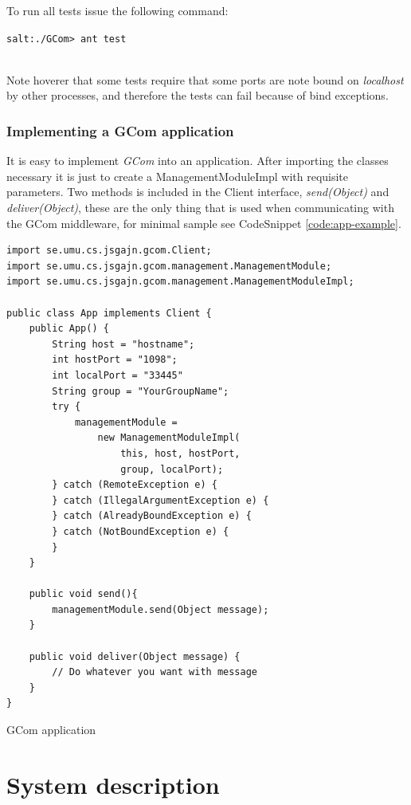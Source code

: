 \documentclass[titlepage, twocolumn, a4paper, 10pt]{article}
\begin{document}
To run all tests issue the following command:\\
\begin{footnotesize}
  \verb!salt:./GCom> ant test!
\end{footnotesize}\\
Note hoverer that some tests require that some ports are note bound on
\textit{localhost} by other processes, and therefore the tests can
fail because of bind exceptions.

\subsubsection{Implementing a GCom application}\label{sec:implgcom}
It is easy to implement \textit{GCom} into an application. After
importing the classes necessary it is just to create a
ManagementModuleImpl with requisite parameters. Two methods is
included in the Client interface, \textit{send(Object)} and
\textit{deliver(Object)}, these are the only thing that is used when
communicating with the GCom middleware, for minimal sample see
CodeSnippet \ref{code:app-example}.
\begin{code}
  \begin{footnotesize}
\begin{verbatim}
import se.umu.cs.jsgajn.gcom.Client;
import se.umu.cs.jsgajn.gcom.management.ManagementModule;
import se.umu.cs.jsgajn.gcom.management.ManagementModuleImpl;

public class App implements Client {
    public App() {
        String host = "hostname";
        int hostPort = "1098";
        int localPort = "33445"
        String group = "YourGroupName";
        try {
            managementModule =
                new ManagementModuleImpl(
                    this, host, hostPort,
                    group, localPort);
        } catch (RemoteException e) {
        } catch (IllegalArgumentException e) {
        } catch (AlreadyBoundException e) {
        } catch (NotBoundException e) {
        }
    }

    public void send(){
        managementModule.send(Object message);
    }

    public void deliver(Object message) {
        // Do whatever you want with message
    }
}
\end{verbatim}
  \end{footnotesize}
  \caption{GCom application}
  \label{code:app-example}
\end{code}


\section{System description}\label{sec:system}
\end{document}
